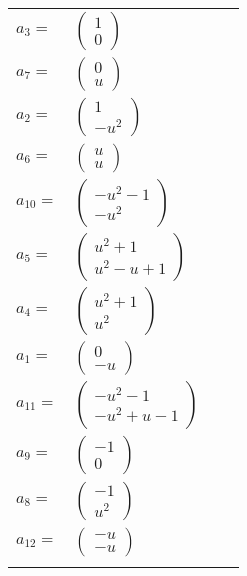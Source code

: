 \documentclass[1p]{elsarticle_modified}
\theoremstyle{definition}
\begin{document}
\begin{tabular}{m{7pt} m{180pt} m{7pt} m{180pt} }
\flushright $a_{3}=$&$\begin{pmatrix}1\\0\end{pmatrix}$ \\
\flushright $a_{7}=$&$\begin{pmatrix}0\\u\end{pmatrix}$ \\
\flushright $a_{2}=$&$\begin{pmatrix}1\\- u^2\end{pmatrix}$ \\
\flushright $a_{6}=$&$\begin{pmatrix}u\\u\end{pmatrix}$ \\
\flushright $a_{10}=$&$\begin{pmatrix}- u^2-1\\- u^2\end{pmatrix}$ \\
\flushright $a_{5}=$&$\begin{pmatrix}u^2+1\\u^2- u+1\end{pmatrix}$ \\
\flushright $a_{4}=$&$\begin{pmatrix}u^2+1\\u^2\end{pmatrix}$ \\
\flushright $a_{1}=$&$\begin{pmatrix}0\\- u\end{pmatrix}$ \\
\flushright $a_{11}=$&$\begin{pmatrix}- u^2-1\\- u^2+u-1\end{pmatrix}$ \\
\flushright $a_{9}=$&$\begin{pmatrix}-1\\0\end{pmatrix}$ \\
\flushright $a_{8}=$&$\begin{pmatrix}-1\\u^2\end{pmatrix}$ \\
\flushright $a_{12}=$&$\begin{pmatrix}- u\\- u\end{pmatrix}$\\&\end{tabular}
\end{document}
